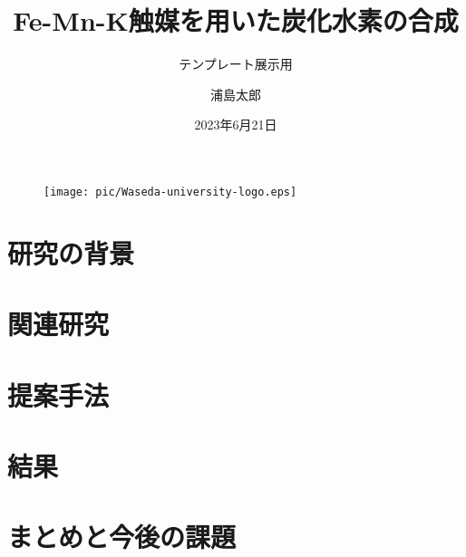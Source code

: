\documentclass{beamer}
\author{浦島太郎}
\title{Fe-Mn-K触媒を用いた炭化水素の合成}
\subtitle{テンプレート展示用}
\institute{早稻田大学医学部}
\date{2023年6月21日}
\begin{document}
\begin{frame}
    \titlepage
    \begin{figure}[htpb]
        \begin{center}
            \texttt{[image: pic/Waseda-university-logo.eps]}
        \end{center}
    \end{figure}
\end{frame}

\begin{frame}
    \tableofcontents[sectionstyle=show,subsectionstyle=show/shaded/hide,subsubsectionstyle=show/shaded/hide]
\end{frame}


\section{研究の背景}

\begin{frame}
\end{frame}

\section{関連研究}

\begin{frame}
\end{frame}

\section{提案手法}

\begin{frame}
\end{frame}

\section{結果}

\begin{frame}
\end{frame}

\section{まとめと今後の課題}

\begin{frame}
\end{frame}
\end{document}
